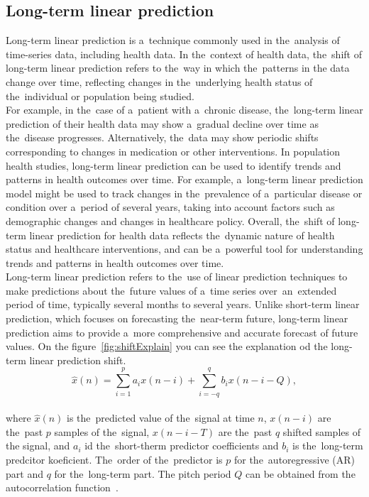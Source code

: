 \subsection{Long-term linear prediction}\label{subsec:longlp}
Long-term linear prediction is a~technique commonly used in the~analysis of time-series data, including health data.
In the~context of health data, the~shift of long-term linear prediction refers to the~way in which the~patterns in the
data change over time, reflecting changes in the~underlying health status of the~individual or population being studied.\\
For example, in the~case of a~patient with a~chronic disease, the~long-term linear prediction of their health data may
show a~gradual decline over time as the~disease progresses. Alternatively, the~data may show periodic shifts
corresponding to changes in medication or other interventions. In population health studies, long-term linear
prediction can be used to identify trends and patterns in health outcomes over time. For example, a~long-term linear
prediction model might be used to track changes in the~prevalence of a~particular disease or condition
over a~period of several years, taking into account factors such as demographic changes and changes in healthcare policy.
Overall, the~shift of long-term linear prediction for health data reflects the~dynamic nature of health status and
healthcare interventions, and can be a~powerful tool for understanding trends and patterns in health outcomes over time.
\\
Long-term linear prediction refers to the~use of linear prediction techniques to make predictions about the~future
values of a~time series over~an~extended period of time, typically several months to several years. Unlike short-term
linear prediction, which focuses on forecasting the~near-term future, long-term linear prediction aims to provide a~more
comprehensive and accurate forecast of future values. On the figure~\ref{fig:shiftExplain} you can see the explanation od the long-term linear prediction shift.\\
\begin{equation}\label{eq:ltlp}
    \hat{x}(n) = \sum_{i=1}^{p} a_i x(n-i) + \sum_{i=-q}^{q} b_i x(n-i-Q),
\end{equation}
\\
where $\hat{x}(n)$ is the~predicted value of the~signal at time $n$, $x(n-i)$ are the~past $p$ samples of the~signal, $x(n-i-T)$ are the~past $q$ shifted samples of the signal, and $a_i$ id the~short-therm predictor coefficients and $b_i$ is the~long-term predcitor koeficient. The~order of the~predictor is $p$ for the~autoregressive (AR) part and $q$ for the~long-term part. The pitch period $Q$ can be obtained from the autocorrelation function~\cite{vaseghi2008advanced}.\\
